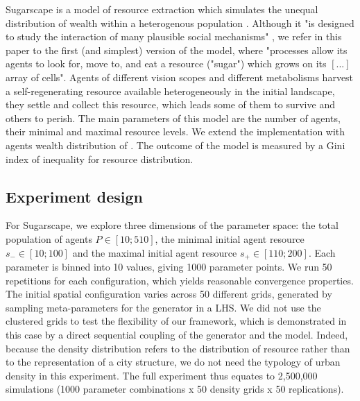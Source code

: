 \documentclass[preprint,5p,times,twocolumn,authoryear]{elsarticle}
\begin{document}
Sugarscape is a model of resource extraction which simulates the unequal distribution of wealth within a heterogenous population \cite{EpsteinAxtell1996}. Although it "is designed to study the interaction of many plausible social mechanisms" \cite[p.125]{Axtelletal1996}, we refer in this paper to the first (and simplest) version of the model, where "processes allow its agents to look for, move to, and eat a resource ("sugar") which grows on its $[...]$ array of cells". Agents of different vision scopes and different metabolisms harvest a self-regenerating resource available heterogeneously in the initial landscape, they settle and collect this resource, which leads some of them to survive and others to perish. The main parameters of this model are the number of agents, their minimal and maximal resource levels.  We extend the implementation with agents wealth distribution of \cite{li2009netlogo}. The outcome of the model is measured by a Gini index of inequality for resource distribution. 


\subsection{Experiment design}
For Sugarscape, we explore three dimensions of the parameter space: the total population of agents $P\in \left[10;510\right]$, the minimal initial agent resource $s_{-}\in \left[10;100\right]$ and the maximal initial agent resource $s_{+}\in \left[110;200\right]$. Each parameter is binned into 10 values, giving 1000 parameter points. We run 50 repetitions for each configuration, which yields reasonable convergence properties. The initial spatial configuration varies across 50 different grids, generated by sampling meta-parameters for the generator in a LHS. We did not use the clustered grids to test the flexibility of our framework, which is demonstrated in this case by a direct sequential coupling of the generator and the model. Indeed, because the density distribution refers to the distribution of resource rather than to the representation of a city structure, we do not need the typology of urban density in this experiment. The full experiment thus equates to 2,500,000 simulations (1000 parameter combinations x 50 density grids x 50 replications). 
\end{document}
